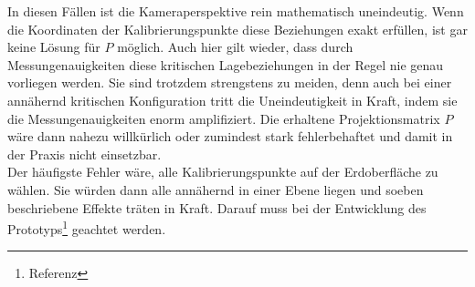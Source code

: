 \noindent In diesen Fällen ist die Kameraperspektive rein mathematisch uneindeutig. Wenn die Koordinaten der Kalibrierungspunkte diese Beziehungen exakt erfüllen, ist gar keine Lösung für $P$ möglich. Auch hier gilt wieder, dass durch Messungenauigkeiten diese kritischen Lagebeziehungen in der Regel nie genau vorliegen werden. Sie sind trotzdem strengstens zu meiden, denn auch bei einer annähernd kritischen Konfiguration tritt die Uneindeutigkeit in Kraft, indem sie die Messungenauigkeiten enorm amplifiziert. Die erhaltene Projektionsmatrix $P$ wäre dann nahezu willkürlich oder zumindest stark fehlerbehaftet und damit in der Praxis nicht einsetzbar.\\
Der häufigste Fehler wäre, alle Kalibrierungspunkte auf der Erdoberfläche zu wählen. Sie würden dann alle annähernd in einer Ebene liegen und soeben beschriebene Effekte träten in Kraft. Darauf muss bei der Entwicklung des Prototyps\footnote{Referenz} geachtet werden.

